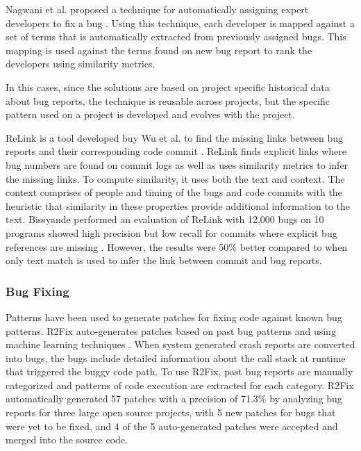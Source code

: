 \documentclass[conference]{IEEEtran}
\begin{document}
Nagwani et al. proposed a technique for automatically assigning expert developers to fix a bug \cite{predicting_nagwani}. Using this technique, each developer is mapped against a set of terms that is automatically extracted from previously assigned bugs. This mapping is used against the terms found on new bug report to rank the developers using similarity metrics.

In this cases, since the solutions are based on project specific historical data about bug reports, the technique is reusable across projects, but the specific pattern used on a project is developed and evolves with the project.

ReLink is a tool developed buy Wu et al. to find the missing links between bug reports and their corresponding code commit \cite{relink_wu}. ReLink finds explicit links where bug numbers are found on commit logs as well as uses similarity metrics to infer the missing links. To compute similarity, it uses both the text and context. The context comprises of people and timing of the bugs and code commits with the heuristic that similarity in these properties provide additional information to the text. Bissyande performed an evaluation of ReLink with 12,000 bugs on 10 programs showed high precision but low recall for commits where explicit bug references are missing \cite{empirical_bissyande}. However, the results were 50\% better compared to when only text match is used to infer the link between commit and bug reports.


\subsubsection{Bug Fixing}
Patterns have been used to generate patches for fixing code against known bug patterns. R2Fix auto-generates patches based on past bug patterns and using machine learning techniques \cite{R2Fix_Liu}. When system generated crash reports are converted into bugs, the bugs include detailed information about the call stack at runtime that triggered the buggy code path. To use R2Fix, past bug reports are manually categorized and patterns of code execution are extracted for each category. R2Fix automatically generated 57 patches with a precision of 71.3\% by analyzing bug reports for three large open source projects, with 5 new patches for bugs that were yet to be fixed, and 4 of the 5 auto-generated patches were accepted and merged into the source code.
\end{document}
